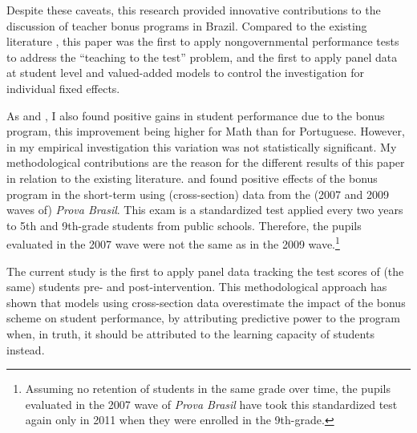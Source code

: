 \documentclass[a4paper, 12pt]{article}
\begin{document}


Despite these caveats, this research provided innovative contributions to the discussion of teacher bonus programs in Brazil. Compared to the existing literature \citep[see][]{lepine2016teacher, oshiro2015impacto}, this paper was the first to apply nongovernmental performance tests to address the  “teaching to the test” problem, and the first to apply panel data at student level and valued-added models to control the investigation for individual fixed effects.


 

As \citet{lepine2016teacher} and \citet{oshiro2015impacto}, I also found positive gains in student performance due to the bonus program, this improvement being higher for Math than for Portuguese. However, in my empirical investigation this variation was not statistically significant. My methodological contributions are the reason for the different results of this paper in relation to the existing literature. \citet{lepine2016teacher} and \citet{oshiro2015impacto} found positive effects of the bonus program in the short-term using (cross-section) data from the (2007 and 2009 waves of) \textit{Prova Brasil}. This exam is a standardized test applied every two years to 5th and 9th-grade students from public schools. Therefore, the pupils evaluated in the 2007 wave were not the same as in the 2009 wave.\footnote{Assuming no retention of students in the same grade over time, the pupils evaluated in the 2007 wave of \textit{Prova Brasil} have took this standardized test again only in 2011 when they were enrolled in the 9th-grade.}

The current study is the first to apply panel data tracking the test scores of (the same) students pre- and post-intervention. This methodological approach has shown that models using cross-section data overestimate the impact of the bonus scheme on student performance, by attributing predictive power to the program \textemdash when, in truth, it should be attributed to the learning capacity of students instead.


\end{document}
